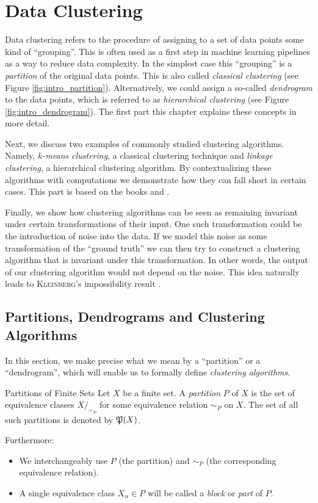 \chapter{Data Clustering}
\label{chapter__dataclustering}

Data clustering refers to the procedure of assigning to a set of data points some kind of ``grouping''. 
This is often used as a first step in machine learning pipelines as a way to reduce data complexity.
In the simplest case this ``grouping'' is a \emph{partition} of the original data points. This is also called \emph{classical clustering} (see Figure \ref{fig:intro_partition}).
Alternatively, we could assign a so-called \emph{dendrogram}
to the data points, which is referred to as \emph{hierarchical clustering} (see Figure \ref{fig:intro_dendrogram}). The first part this chapter explains these concepts in more detail.

Next, we discuss two examples of commonly studied clustering algorithms. Namely, \emph{$k$-means clustering}, a classical clustering technique and \emph{linkage clustering}, a hierarchical clustering algorithm.
%
By contextualizing these algorithms with computations we demonstrate how they can fall short in certain cases.
This part is based on the books \cite{Everitt2011} and \cite{Scitovski2021}.

Finally, we show how clustering algorithms can be seen as remaining invariant under certain transformations of their input.
%
One such transformation could be the introduction of noise into the data.
If we model this noise as some transformation of the ``ground truth'' we can then try to construct a clustering algorithm that is invariant under this transformation. In other words, the output of our clustering algorithm would not depend on the noise. This idea naturally leads to \textsc{Kleinberg}'s impossibility result \cite{Kleinberg2002}.


\section{Partitions, Dendrograms and Clustering Algorithms}
\label{section__partitions}
In this section, we make precise what we mean by a ``partition'' or a ``dendrogram'', which will enable us to formally define \emph{clustering algorithms}.

\begin{definition}{Partitions of Finite Sets}{}
Let $X$ be a finite set. A \emph{partition} $P$ of $X$ is the set of equivalence classes $X/_{\sim_P}$ for some equivalence relation $\sim_P$ on $X$. The set of all such partitions is denoted by $\P(X)$.\par

\medskip Furthermore:
\begin{itemize}
    \item We interchangeably use $P$ (the partition) and $\sim_P$ (the corresponding equivalence relation).
    \item A single equivalence class $X_\alpha \in P$ will be called a \emph{block} or \emph{part} of $P$.
\end{itemize}
\end{definition}

